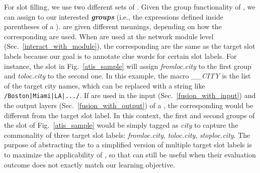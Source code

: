 For slot filling, we use two different sets of \REs. Given the group functionality of \RE, we can assign \REtags to our interested
\textbf{\emph{\RE groups}} (i.e., the expressions defined inside parentheses of a \RE). \REtags are given different meanings, depending on
how the corresponding \REs are used. When \REs are used at the network module level (Sec.~\ref{interact_with_module}), the corresponding
\REtags are the same as the target slot labels because our goal is to annotate clue words for certain slot labels. For instance, the slot
\RE in Fig.~\ref{atis_sample} will assign \emph{fromloc.city} to the first \RE group and \emph{toloc.city} to the second one. In this
example, the macro \emph{\_\_CITY} is the list of the target city names, which can be replaced with a string like
\texttt{\small/Boston|Miami|LA|.../}. If \REs are used in the input (Sec.~\ref{fusion_with_input}) and the output layers
(Sec.~\ref{fusion_with_output}) of a \NN, the corresponding \REtag would be different from the target slot label. In this context, the
first and second \RE groups of the slot \RE of Fig.~\ref{atis_sample} would be simply tagged as \emph{city} to capture the commonality of
three target slot labels: \emph{fromloc.city}, \emph{toloc.city}, \emph{stoploc.city}. The purpose of abstracting the \REtag to a
simplified version of multiple target slot labels is to maximize the applicability of \REs, so that \REs can still be useful when their
evaluation outcome does not exactly match our learning objective.
%

